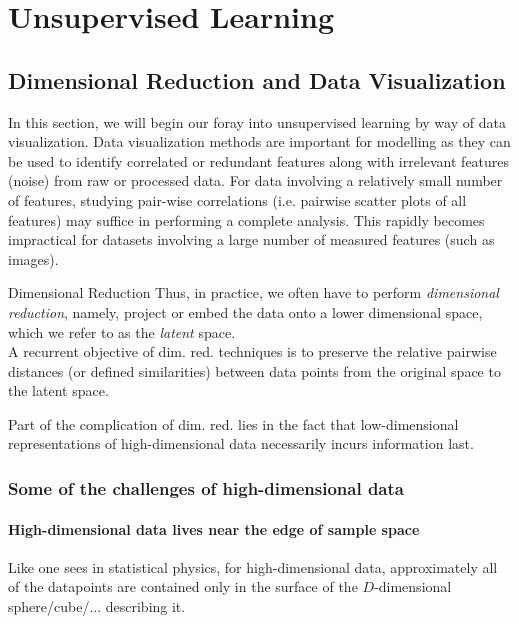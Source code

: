 \chapter{Unsupervised Learning}
\section{Dimensional Reduction and Data Visualization}
\label{sec:dimRed}
In this section, we will begin our foray into unsupervised learning by way of data visualization. Data visualization methods are important for modelling as they can be used to identify correlated or redundant features along with irrelevant features (noise) from raw or processed data. For data involving a relatively small number of features, studying pair-wise correlations (i.e. pairwise scatter plots of all features) may suffice in performing a complete analysis. This rapidly becomes impractical for datasets involving a large number of measured features (such as images). \begin{mybox}{Dimensional Reduction}
	Thus, in practice, we often have to perform \emph{dimensional reduction}, namely, project or embed the data onto a lower dimensional space, which we refer to as the \emph{latent} space.\\
	A recurrent objective of dim. red. techniques is to preserve the relative pairwise distances (or defined similarities) between data points from the original space to the latent space.
\end{mybox}
Part of the complication of dim. red. lies in the fact that low-dimensional representations of high-dimensional data necessarily incurs information last.

\subsection{Some of the challenges of high-dimensional data}
\label{subsec:dimRedChallengesData}
\subsubsection{High-dimensional data lives near the edge of sample space}
Like one sees in statistical physics, for high-dimensional data, approximately all of the datapoints are contained only in the surface of the $D$-dimensional sphere/cube/... describing it.

